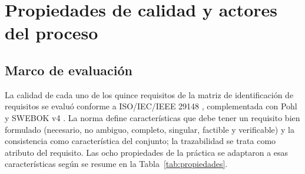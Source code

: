 \documentclass[11pt,a4paper]{article}
\begin{document}
\section{Propiedades de calidad y actores del proceso}

\subsection{Marco de evaluación}

La calidad de cada uno de los quince requisitos de la
matriz de identificación de requisitos se evaluó conforme a
ISO/IEC/IEEE 29148 \cite{iso29148}, complementada con
Pohl \cite{pohl2010} y SWEBOK v4 \cite{swebok4}. La norma
define características que debe tener un requisito bien
formulado (necesario, no ambiguo, completo, singular,
factible y verificable) y la consistencia como característica
del conjunto; la trazabilidad se trata como atributo del
requisito. Las ocho propiedades de la práctica se adaptaron
a esas características según se resume en la
Tabla~\ref{tab:propiedades}.
\end{document}
